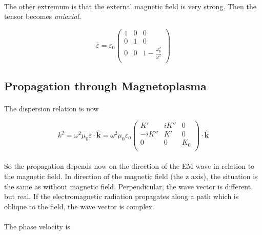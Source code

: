 \documentclass[a4paper,10pt]{thesis}
\begin{document}
\paragraph*{}
The other extremum is that the external magnetic field is very strong. Then the tensor becomes \emph{uniaxial}.

\begin{equation}\label{isotropic_tensor}
    \bar{\varepsilon}=\varepsilon_0\left(%
\begin{array}{ccc}
  1 & 0 & 0 \\
0 & 1 & 0 \\
0 & 0 & 1-\frac{\omega_p^2}{\omega^2} \\\end{array}%
\right)
\end{equation}

\subsection{Propagation through Magnetoplasma}
\paragraph*{}
The dispersion relation is now

\begin{equation}\label{dispersion_relation_magnetoplasma}
    k^2=\omega^2\mu_0 \bar{\varepsilon}\cdot \mathbf{\hat{k}}=\omega^2\mu_0\varepsilon_0\left(%
\begin{array}{ccc}
  K' & iK'' & 0 \\
-iK'' & K' & 0 \\
0 & 0 & K_0 \\\end{array}%
\right)\cdot \mathbf{\hat{k}}
\end{equation}

\paragraph*{}
So the propagation depends now on the direction of the EM wave in relation to the magnetic field. In direction of the magnetic field (the z axis), the situation is the same as without magnetic field. Perpendicular, the wave vector is different, but real. If the electromagnetic radiation propagates along a path which is oblique to the field, the wave vector is complex.

\paragraph*{}
The phase velocity is
\end{document}
